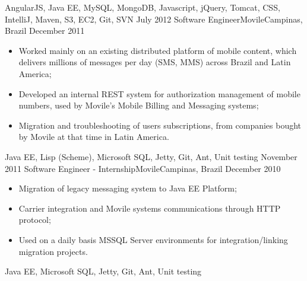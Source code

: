\begin{experiences}
{    }{AngularJS, Java EE, MySQL, MongoDB, Javascript, jQuery, Tomcat, CSS, IntelliJ, Maven, S3, EC2, Git, SVN}
  \emptySeparator
  \experience
    {July 2012} {Software Engineer}{Movile}{Campinas, Brazil}
    {December 2011}    {
          \begin{itemize}
            \item Worked mainly on an existing distributed platform of mobile content, which delivers millions of
            messages per day (SMS, MMS) across Brazil and Latin America;
            \item Developed an internal REST system for authorization management of mobile numbers,
             used by Movile's Mobile Billing and Messaging systems;
            \item Migration and troubleshooting of users subscriptions, from companies bought by Movile at that time in Latin America.\\
          \end{itemize}
        }{Java EE, Lisp (Scheme), Microsoft SQL, Jetty, Git, Ant, Unit testing}
  \emptySeparator
  \experience
  {November 2011} {Software Engineer - Internship}{Movile}{Campinas, Brazil}
  {December 2010}
        {
          \begin{itemize}
            \item Migration of legacy messaging system to Java EE Platform;
            \item Carrier integration and Movile systems communications through HTTP protocol;
            \item Used on a daily basis MSSQL Server environments for integration/linking migration projects.\\
          \end{itemize}
        }{Java EE, Microsoft SQL, Jetty, Git, Ant, Unit testing}
\end{experiences}
